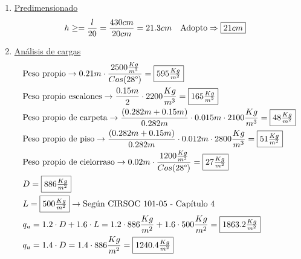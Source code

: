 \newpage
\begin{enumerate}
\item \underline{Predimensionado}
\begin{align*}
& h \geq = \frac{l}{20} = \frac{430cm}{20cm} = 21.3cm \quad \text{Adopto}\Rightarrow \framebox{$21cm$}
\end{align*}

\item \underline{Análisis de cargas}
\begin{align*}
& \text{Peso propio} \rightarrow 0.21m \cdot \frac{2500 \frac{Kg}{m^3}}{Cos(28\text{°})} = \framebox{$595 \frac{Kg}{m^2}$}\\
& \text{Peso propio escalones} \rightarrow \frac{0.15m}{2} \cdot 2200 \frac{Kg}{m^3} = \framebox{$165 \frac{Kg}{m^2}$}\\
& \text{Peso propio de carpeta} \rightarrow \frac{(0.282m + 0.15m)}{0.282m} \cdot 0.015m \cdot 2100 \frac{Kg}{m^3} = \framebox{$48 \frac{Kg}{m^2}$}\\
& \text{Peso propio de piso} \rightarrow \frac{(0.282m + 0.15m)}{0.282m} \cdot 0.012m \cdot 2800 \frac{Kg}{m^3} = \framebox{$51 \frac{Kg}{m^2}$}\\
& \text{Peso propio de cielorraso} \rightarrow 0.02m \cdot \frac{1200 \frac{Kg}{m^3}}{Cos(28\text{°})} = \framebox{$27 \frac{Kg}{m^2}$}\\
& D = \framebox{$886 \frac{Kg}{m^2}$}\\
& L = \framebox{$500 \frac{Kg}{m^2}$} \rightarrow \text{Según CIRSOC 101-05 - Capítulo 4}\\
& q_u = 1.2 \cdot D + 1.6 \cdot L = 1.2 \cdot 886 \frac{Kg}{m^2} + 1.6 \cdot 500 \frac{Kg}{m^2} = \framebox{$1863.2 \frac{Kg}{m^2}$}\\
& q_u = 1.4 \cdot D = 1.4 \cdot 886 \frac{Kg}{m^2} = \framebox{$1240.4 \frac{Kg}{m^2}$}
\end{align*}


\end{enumerate}
